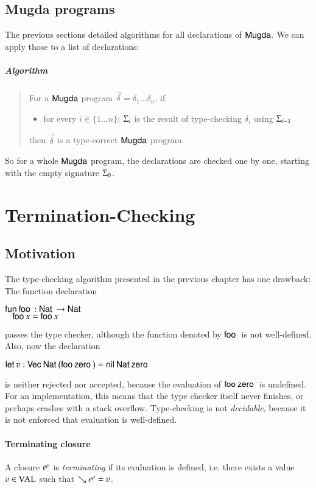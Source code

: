 
\section{Mugda programs}
\label{tca}
The previous sections detailed algorithms for all declarations of $\textsf{Mugda}$. 
We can apply those to a list of declarations:
\paragraph*{Algorithm}
\begin{quote}
For a $\textsf{Mugda}$ program $ \vec{\delta} = \delta_1 \ldots \delta_n$, if
\begin{itemize}
\item
for every $i \in \{ 1 \ldots n \}$: $\Sigma_i$ is the result of type-checking $\delta_i$ using $\Sigma_{i-1}$
\end{itemize}
then $\vec{\delta}$ is a type-correct $\textsf{Mugda}$ program.
\end{quote}
So for a whole $\textsf{Mugda}$ program, the declarations are checked one by one, starting with the empty signature $\Sigma_0$.

\chapter{Termination-Checking}

\section{Motivation}
The type-checking algorithm presented in the previous chapter has one drawback:
The function declaration
\begin{bsp}
$\mathsf{fun}\: \mathsf{foo}\: : \mathsf{Nat}\: \rightarrow \mathsf{Nat}\:$\\
$\hspace*{3mm} \mathsf{foo}\: x = \mathsf{foo}\: x$
\end{bsp}
passes the type checker, although the function denoted by $\mathsf{foo}\:$ is not well-defined.
Also, now the declaration
\begin{bsp}
$\mathsf{let}\: v : \mathsf{Vec}\: \mathsf{Nat}\: (\mathsf{foo}\: \mathsf{zero}\:) = \mathsf{nil}\: \mathsf{Nat}\: \mathsf{zero}\:$
\end{bsp}
is neither rejected nor accepted, because the evaluation of $\mathsf{foo}\: \mathsf{zero}\:$ is undefined.
For an implementation, this means that the type checker itself never finishes, or perhaps crashes with a stack overflow.
Type-checking is not \emph{decidable}, because it is not enforced that evaluation is well-defined.


\subsubsection{Terminating closure}
A closure $e^{\rho}$ is \emph{terminating} if its evaluation is defined, i.e. there exists a value $v \in \operatorname{VAL}$ such that $\searrow e^{\rho}= v$. 

